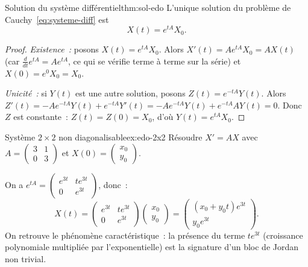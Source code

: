 \begin{theorem}{Solution du système différentiel}{thm:sol-edo}
  L'unique solution du problème de Cauchy~\eqref{eq:systeme-diff} est
  \[
    X(t)=e^{tA}X_0.
  \]
\end{theorem}

\begin{proof}
  \emph{Existence~:} posons $X(t)=e^{tA}X_0$. Alors
  $X'(t)=Ae^{tA}X_0=AX(t)$ (car $\frac{d}{dt}e^{tA}=Ae^{tA}$, ce qui
  se vérifie terme à terme sur la série) et $X(0)=e^0X_0=X_0$.

  \emph{Unicité~:} si $Y(t)$ est une autre solution, posons
  $Z(t)=e^{-tA}Y(t)$. Alors
  $Z'(t)=-Ae^{-tA}Y(t)+e^{-tA}Y'(t)=-Ae^{-tA}Y(t)+e^{-tA}AY(t)=0$.
  Donc $Z$ est constante~: $Z(t)=Z(0)=X_0$, d'où $Y(t)=e^{tA}X_0$.
\end{proof}

\begin{example}{Système $2\times 2$ non diagonalisable}{ex:edo-2x2}
  Résoudre $X'=AX$ avec $A=\begin{pmatrix}3&1\\0&3\end{pmatrix}$ et
  $X(0)=\begin{pmatrix}x_0\\y_0\end{pmatrix}$.

  On a $e^{tA}=\begin{pmatrix}e^{3t}&te^{3t}\\0&e^{3t}\end{pmatrix}$,
  donc~:
  \[
    X(t)=\begin{pmatrix}e^{3t}&te^{3t}\\0&e^{3t}\end{pmatrix}
    \begin{pmatrix}x_0\\y_0\end{pmatrix}
    =\begin{pmatrix}(x_0+y_0t)e^{3t}\\y_0e^{3t}\end{pmatrix}.
  \]
  On retrouve le phénomène caractéristique~: la présence du terme $te^{3t}$
  (croissance polynomiale multipliée par l'exponentielle) est la signature
  d'un bloc de Jordan non trivial.
\end{example}

